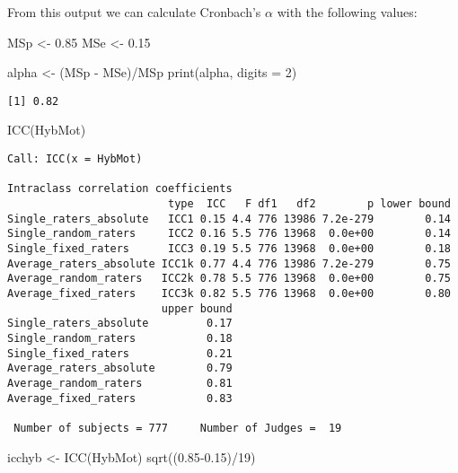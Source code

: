 \documentclass[
]{book}
\newenvironment{Shaded}{\begin{snugshade}}{\end{snugshade}}
\newcommand{\AttributeTok}[1]{\textcolor[rgb]{0.77,0.63,0.00}{#1}}
\newcommand{\DecValTok}[1]{\textcolor[rgb]{0.00,0.00,0.81}{#1}}
\newcommand{\FloatTok}[1]{\textcolor[rgb]{0.00,0.00,0.81}{#1}}
\newcommand{\FunctionTok}[1]{\textcolor[rgb]{0.00,0.00,0.00}{#1}}
\newcommand{\NormalTok}[1]{#1}
\newcommand{\OtherTok}[1]{\textcolor[rgb]{0.56,0.35,0.01}{#1}}
\newcommand{\SpecialCharTok}[1]{\textcolor[rgb]{0.00,0.00,0.00}{#1}}
\begin{document}
From this output we can calculate Cronbach's \(\alpha\) with the following values:

\begin{Shaded}
\begin{Highlighting}[]
\NormalTok{MSp }\OtherTok{\textless{}{-}} \FloatTok{0.85}
\NormalTok{MSe }\OtherTok{\textless{}{-}} \FloatTok{0.15}

\NormalTok{alpha }\OtherTok{\textless{}{-}}\NormalTok{ (MSp }\SpecialCharTok{{-}}\NormalTok{ MSe)}\SpecialCharTok{/}\NormalTok{MSp}
\FunctionTok{print}\NormalTok{(alpha, }\AttributeTok{digits =} \DecValTok{2}\NormalTok{)}
\end{Highlighting}
\end{Shaded}

\begin{verbatim}
[1] 0.82
\end{verbatim}

\begin{Shaded}
\begin{Highlighting}[]
\FunctionTok{ICC}\NormalTok{(HybMot)}
\end{Highlighting}
\end{Shaded}

\begin{verbatim}
Call: ICC(x = HybMot)

Intraclass correlation coefficients 
                         type  ICC   F df1   df2        p lower bound
Single_raters_absolute   ICC1 0.15 4.4 776 13986 7.2e-279        0.14
Single_random_raters     ICC2 0.16 5.5 776 13968  0.0e+00        0.14
Single_fixed_raters      ICC3 0.19 5.5 776 13968  0.0e+00        0.18
Average_raters_absolute ICC1k 0.77 4.4 776 13986 7.2e-279        0.75
Average_random_raters   ICC2k 0.78 5.5 776 13968  0.0e+00        0.75
Average_fixed_raters    ICC3k 0.82 5.5 776 13968  0.0e+00        0.80
                        upper bound
Single_raters_absolute         0.17
Single_random_raters           0.18
Single_fixed_raters            0.21
Average_raters_absolute        0.79
Average_random_raters          0.81
Average_fixed_raters           0.83

 Number of subjects = 777     Number of Judges =  19
\end{verbatim}

\begin{Shaded}
\begin{Highlighting}[]
\NormalTok{icchyb }\OtherTok{\textless{}{-}} \FunctionTok{ICC}\NormalTok{(HybMot)}
\FunctionTok{sqrt}\NormalTok{((}\FloatTok{0.85{-}0.15}\NormalTok{)}\SpecialCharTok{/}\DecValTok{19}\NormalTok{)}
\end{Highlighting}
\end{Shaded}
\end{document}
